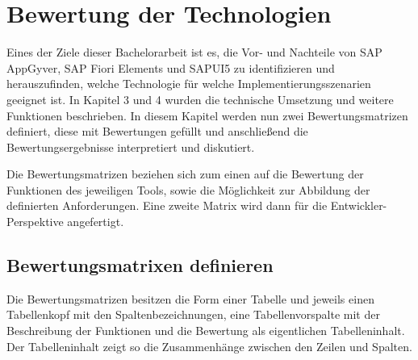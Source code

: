 
\chapter{Bewertung der Technologien} \label{EV}

Eines der Ziele dieser Bachelorarbeit ist es, die Vor- und Nachteile von SAP AppGyver, SAP Fiori Elements und SAPUI5 zu identifizieren und herauszufinden, welche Technologie für welche Implementierungsszenarien geeignet ist. In Kapitel 3 und 4 wurden die technische Umsetzung und weitere Funktionen beschrieben. In diesem Kapitel werden nun zwei Bewertungsmatrizen definiert, diese mit Bewertungen gefüllt und anschließend die Bewertungsergebnisse interpretiert und diskutiert.

Die Bewertungsmatrizen beziehen sich zum einen auf die Bewertung der Funktionen des jeweiligen Tools, sowie die Möglichkeit zur Abbildung der definierten Anforderungen. Eine zweite Matrix wird dann für die Entwickler-Perspektive angefertigt.

\section{Bewertungsmatrixen definieren}
Die Bewertungsmatrizen besitzen die Form einer Tabelle \cite{wi:ma} und jeweils einen Tabellenkopf mit den Spaltenbezeichnungen, eine Tabellenvorspalte mit der Beschreibung der Funktionen und die Bewertung als eigentlichen Tabelleninhalt. Der Tabelleninhalt zeigt so die Zusammenhänge zwischen den Zeilen und Spalten. \cite{wi:ta} 

